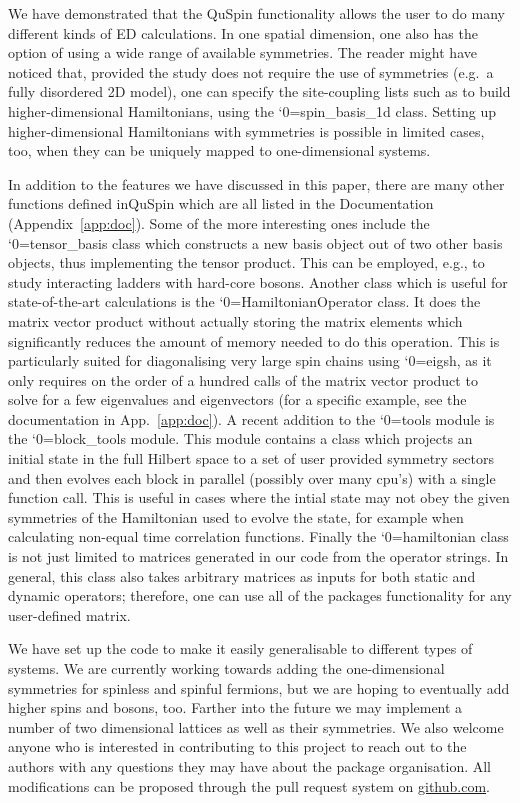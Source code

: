 \documentclass{SciPost}
\newcommand\0{\scalebox{-1}[1]{0}}
\let\svttfamily\ttfamily
\renewcommand\ttfamily{\svttfamily\catcode`0=\active }
\renewcommand\texttt{\bgroup\ttfamily\texttthelp}
\def\texttthelp#1{#1\egroup}
\begin{document}
We have demonstrated that the QuSpin functionality allows the user to do many different kinds of ED calculations. In one spatial dimension, one also has the option of using a wide range of available symmetries. The reader might have noticed that, provided the study does not require the use of symmetries (e.g.~a fully disordered 2D model), one can specify the site-coupling lists such as to build higher-dimensional Hamiltonians, using the \texttt{spin\_basis\_1d} class. Setting up higher-dimensional Hamiltonians with symmetries is possible in limited cases, too, when they can be uniquely mapped to one-dimensional systems. 

In addition to the features we have discussed in this paper, there are many other functions defined inQuSpin which are all listed in the Documentation (Appendix~\ref{app:doc}). Some of the more interesting ones include the \texttt{tensor\_basis} class which constructs a new basis object out of two other basis objects, thus implementing the tensor product. This can be employed, e.g., to study interacting ladders with hard-core bosons. Another class which is useful for state-of-the-art calculations is the \texttt{HamiltonianOperator} class. It does the matrix vector product without actually storing the matrix elements which significantly reduces the amount of memory needed to do this operation. This is particularly suited for diagonalising very large spin chains using \texttt{eigsh}, as it only requires on the order of a hundred calls of the matrix vector product to solve for a few eigenvalues and eigenvectors (for a specific example, see the documentation in App.~\ref{app:doc}). A recent addition to the \texttt{tools} module is the \texttt{block\_tools} module. This module contains a class which projects an initial state in the full Hilbert space to a set of user provided symmetry sectors and then evolves each block in parallel (possibly over many cpu's) with a single function call. This is useful in cases where the intial state may not obey the given symmetries of the Hamiltonian used to evolve the state, for example when calculating non-equal time correlation functions. Finally the \texttt{hamiltonian} class is not just limited to matrices generated in our code from the operator strings. In general, this class also takes arbitrary matrices as inputs for both static and dynamic operators; therefore, one can use all of the packages functionality for any user-defined matrix.

We have set up the code to make it easily generalisable to different types of systems. We are currently working towards adding the one-dimensional symmetries for spinless and spinful fermions, but we are hoping to eventually add higher spins and bosons, too. Farther into the future we may implement a number of two dimensional lattices as well as their symmetries. We also welcome anyone who is interested in contributing to this project to reach out to the authors with any questions they may have about the package organisation. All modifications can be proposed through the pull request system on \href{https://github.com/weinbe58/qspin}{github.com}.  
\end{document}
